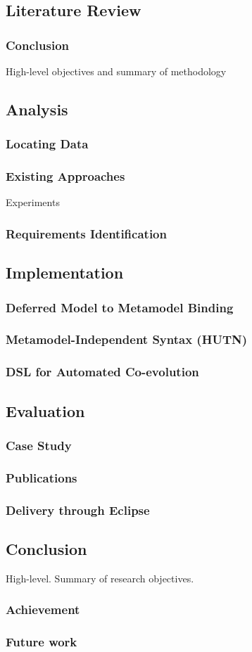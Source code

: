 \subsection{Literature Review}
\subsubsection{Conclusion}
High-level objectives and summary of methodology

\subsection{Analysis}
\subsubsection{Locating Data}
\subsubsection{Existing Approaches}
Experiments
\subsubsection{Requirements Identification}

\subsection{Implementation}
\subsubsection{Deferred Model to Metamodel Binding}
\subsubsection{Metamodel-Independent Syntax (HUTN)}
\subsubsection{DSL for Automated Co-evolution}

\subsection{Evaluation}
\subsubsection{Case Study}
\subsubsection{Publications}
\subsubsection{Delivery through Eclipse}

\subsection{Conclusion}
High-level. Summary of research objectives.

\subsubsection{Achievement}
\subsubsection{Future work}